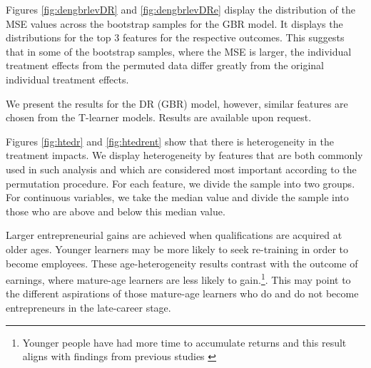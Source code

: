 \documentclass[12pt, a4paper]{article}
\begin{document}
Figures \ref{fig:dengbrlevDR} and \ref{fig:dengbrlevDRe} display the distribution of the MSE values across
the bootstrap samples for the GBR model. It displays the distributions for the
top 3 features for the respective outcomes. This suggests that in some of the bootstrap samples,
where the MSE is larger, the individual treatment effects from the permuted
data differ greatly from the original individual treatment effects.

We present the results for the DR (GBR) model, however, similar features are chosen from the T-learner models. Results are available upon request. 




Figures \ref{fig:htedr} and \ref{fig:htedrent} show that there is heterogeneity in the treatment impacts. We display heterogeneity by features that are both commonly used in such analysis and which are considered most important according to
the permutation procedure. For each feature, we divide the sample into two
groups. For continuous variables, we take the median value and divide the
sample into those who are above and below this median value. 

Larger entrepreneurial gains are achieved when qualifications are acquired at
older ages. Younger learners may be more likely to seek re-training in order to become employees. These age-heterogeneity results contrast with the outcome of earnings, where mature-age learners are less likely to gain.\footnote{Younger people have had more time to accumulate returns and this result aligns with findings from previous studies
\citep{polidano2016,dorsett2016,perales2017}}. This may point to the different aspirations of those mature-age learners who do and do not become entrepreneurs in the late-career stage.  
\end{document}
